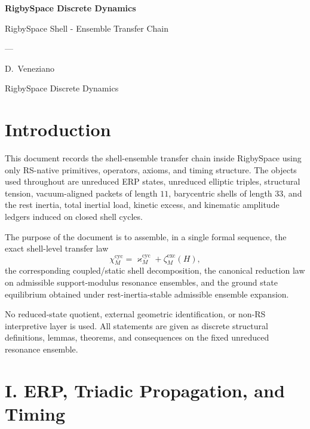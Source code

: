 \documentclass[11pt,letterpaper]{article}
\theoremstyle{plain}
\theoremstyle{definition}
\theoremstyle{remark}
\newcommand{\RestInertia}{\varkappa}
\newcommand{\TotInertia}{\chi}
\newcommand{\AccAction}{\zeta}
\begin{document}
\begin{titlepage}
\centering
\vspace*{2cm}
{\Huge\bfseries\color{RSblue}RigbySpace Discrete Dynamics\par}
\vspace{0.5cm}
{\LARGE RigbySpace Shell - Ensemble Transfer Chain\par}
\vspace{0.5cm}
{\large ---\par}
\vspace{2cm}
{\large D.\ Veneziano\par}
\vspace{0.3cm}
{\normalsize RigbySpace Discrete Dynamics\par}
\vspace{0.3cm}
\end{titlepage}

\newpage

\section*{Introduction}

This document records the shell-ensemble transfer chain inside RigbySpace using only RS-native primitives, operators, axioms, and timing structure. The objects used throughout are unreduced ERP states, unreduced elliptic triples, structural tension, vacuum-aligned packets of length \(11\), barycentric shells of length \(33\), and the rest inertia, total inertial load, kinetic excess, and kinematic amplitude ledgers induced on closed shell cycles.

The purpose of the document is to assemble, in a single formal sequence, the exact shell-level transfer law
\[
\TotInertia_M^{\mathrm{cyc}}
=
\RestInertia_M^{\mathrm{cyc}}
+
\AccAction_M^{\mathrm{exc}}(H),
\]
the corresponding coupled/static shell decomposition, the canonical reduction law on admissible support-modulus resonance ensembles, and the ground state equilibrium obtained under rest-inertia-stable admissible ensemble expansion.

No reduced-state quotient, external geometric identification, or non-RS interpretive layer is used. All statements are given as discrete structural definitions, lemmas, theorems, and consequences on the fixed unreduced resonance ensemble.

\section*{I. ERP, Triadic Propagation, and Timing}
\end{document}
